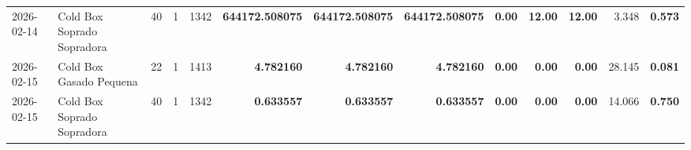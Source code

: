 {\begin{center}
{\begin{tabular}{@{}llrrrrrrrrrrr@{}}
2026-02-14 & Cold Box Soprado Sopradora & 40 & 1 & 1342 & \textbf{644172.508075} & \textbf{644172.508075} & \textbf{644172.508075} & \textbf{0.00} & \textbf{12.00} & \textbf{12.00} & 3.348 & \textbf{0.573} \\
2026-02-15 & Cold Box Gasado Pequena & 22 & 1 & 1413 & \textbf{4.782160} & \textbf{4.782160} & \textbf{4.782160} & \textbf{0.00} & \textbf{0.00} & \textbf{0.00} & 28.145 & \textbf{0.081} \\
2026-02-15 & Cold Box Soprado Sopradora & 40 & 1 & 1342 & \textbf{0.633557} & \textbf{0.633557} & \textbf{0.633557} & \textbf{0.00} & \textbf{0.00} & \textbf{0.00} & 14.066 & \textbf{0.750} \\
\bottomrule
\end{tabular}%
}
\end{center}
}
\vspace*{\fill}
\newpage
\vspace*{\fill}
